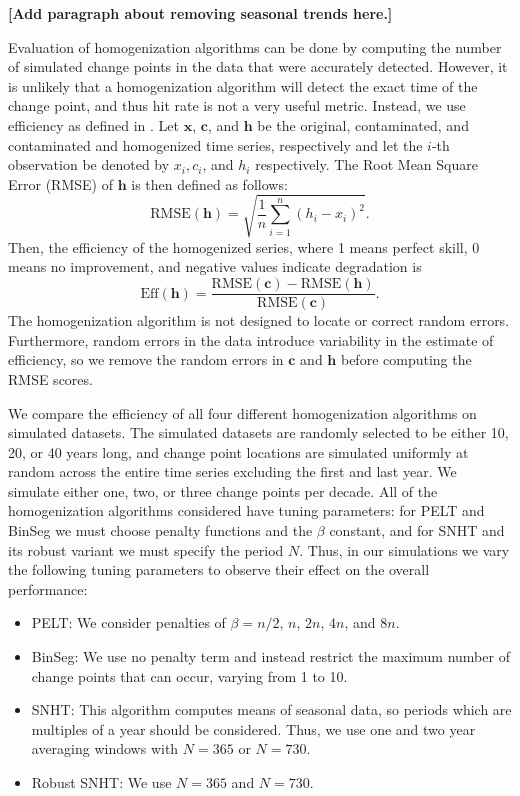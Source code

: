 \documentclass[12pt]{article}
\begin{document}
\begin{doublespacing}
\textbf{[Add paragraph about removing seasonal trends here.]}

Evaluation of homogenization algorithms can be done by computing the number of simulated change points in the data that were accurately detected.  However, it is unlikely that a homogenization algorithm will detect the exact time of the change point, and thus hit rate is not a very useful metric.  Instead, we use efficiency as defined in \cite{domonkos13}.  Let $\mathbf{x}$, $\mathbf{c}$, and $\mathbf{h}$ be the original, contaminated, and contaminated and homogenized time series, respectively and let the $i$-th observation be denoted by $x_i, c_i$, and $h_i$ respectively.  The Root Mean Square Error (RMSE) of $\mathbf{h}$ is then defined as follows:
\begin{equation*}
	\mbox{RMSE}(\mathbf{h}) = \sqrt{\frac{1}{n} \sum_{i=1}^n (h_i-x_i)^2}.
\end{equation*}
Then, the efficiency of the homogenized series, where 1 means perfect skill, 0 means no improvement, and negative values indicate degradation is
\begin{equation*}
	\mbox{Eff}(\mathbf{h}) = \frac{\mbox{RMSE}(\mathbf{c})-\mbox{RMSE}(\mathbf{h})}{\mbox{RMSE}(\mathbf{c})}.
\end{equation*}
The homogenization algorithm is not designed to locate or correct random errors.  Furthermore, random errors in the data introduce variability in the estimate of efficiency, so we remove the random errors in $\mathbf{c}$ and $\mathbf{h}$ before computing the RMSE scores.  

We compare the efficiency of all four different homogenization algorithms on simulated datasets.  The simulated datasets are randomly selected to be either  10, 20, or 40 years long, and change point locations are simulated uniformly at random across the entire time series excluding the first and last year.  We simulate either one, two, or three change points per decade.  All of the homogenization algorithms considered have tuning parameters: for PELT and BinSeg we must choose penalty functions and the $\beta$ constant, and for SNHT and its robust variant we must specify the period $N$.  Thus, in our simulations we vary the following tuning parameters to observe their effect on the overall performance:

\begin{itemize}
	\item PELT: We consider penalties of $\beta=n/2$, $n$, $2n$, $4n$, and  $8n$.
	\item BinSeg: We use no penalty term and instead restrict the maximum number of change points that can occur, varying from 1 to 10.
	\item SNHT: This algorithm computes means of seasonal data, so periods which are multiples of a year should be considered.  Thus, we use one and two year averaging windows with $N=365$ or $N=730$.
	\item Robust SNHT: We  use $N=365$ and $N= 730$.
\end{itemize}






\end{doublespacing}
\end{document}
